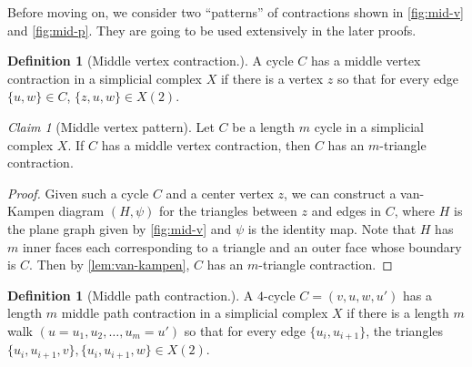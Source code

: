 \documentclass[10pt,a4paper]{article}
\newcommand{\prettyref}[1]{\cref{#1}}
\theoremstyle{definition}
\newtheorem{definition}[theorem]{Definition}
\theoremstyle{remark}
\newtheorem{claim}[theorem]{Claim}
\newcommand{\set}[1]{\{#1\}}
\numberwithin{equation}{section}
\let\pref=\prettyref
\begin{document}
Before moving on, we consider two ``patterns'' of contractions shown in \pref{fig:mid-v} and \pref{fig:mid-p}. They are going to be used extensively in the later proofs. 

\begin{definition}[Middle vertex contraction.] \label{def:middle-vertex}
    A cycle $C$ has a middle vertex contraction in a simplicial complex \(X\) if there is a vertex \(z\) so that for every edge \(\set{u,w} \in C\), \(\set{z,u,w} \in X(2)\).
\end{definition}

\begin{claim}[Middle vertex pattern] \label{claim:middle-vertex}
    Let \(C\) be a length \(m\) cycle in a simplicial complex $X$. If $C$ has a middle vertex contraction, then \(C\) has an \(m\)-triangle contraction.
\end{claim}

\begin{proof}
    Given such a cycle $C$ and a center vertex $z$, we can construct a van-Kampen diagram $(H, \psi)$ for the triangles between $z$ and edges in $C$, where $H$ is the plane graph given by \pref{fig:mid-v} and $\psi$ is the identity map. Note that $H$ has $m$ inner faces each corresponding to a triangle and an outer face whose boundary is $C$. Then by \pref{lem:van-kampen}, $C$ has an $m$-triangle contraction.
\end{proof}

\begin{definition}[Middle path contraction.] \label{def:middle-path}
    A $4$-cycle \(C=(v,u,w,u')\) has a length $m$ middle path contraction in a simplicial complex \(X\) if there is a length $m$ walk \((u=u_1,u_2,\dots,u_m=u')\) so that for every edge \(\set{u_i,u_{i+1}}\), the triangles \(\set{u_i,u_{i+1},v}, \set{u_i,u_{i+1},w} \in X(2)\). 
\end{definition}
\end{document}
